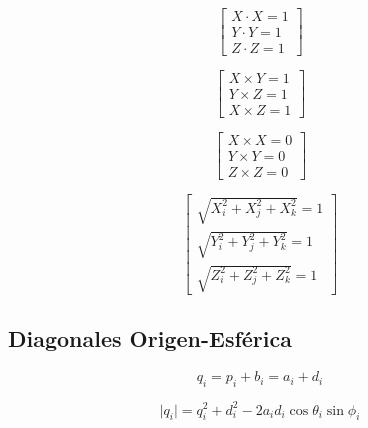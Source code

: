 \documentclass[titlepage, letterpaper, fleqn]{article}
\begin{document}
\begin{equation}
    \label{eq:dot_same_unit_vector}
    \begin{bmatrix}
    X \cdot X = 1 \\
    Y \cdot Y = 1 \\
    Z \cdot Z = 1
    \end{bmatrix}
\end{equation}

\begin{equation}
    \label{eq:cross_unit_vectors}
    \begin{bmatrix}
    X \times Y = 1 \\
    Y \times Z = 1 \\
    X \times Z = 1
    \end{bmatrix}
\end{equation}

\begin{equation}
    \label{eq:cross_same_unit_vector}
    \begin{bmatrix}
    X \times X = 0 \\
    Y \times Y = 0 \\
    Z \times Z = 0
    \end{bmatrix}
\end{equation}

\begin{equation}
    \label{eq:magnitude_unit_vector}
    \begin{bmatrix}
    \sqrt{X_i^2 + X_j^2 + X_k^2} = 1 \\
    \sqrt{Y_i^2 + Y_j^2 + Y_k^2} = 1 \\
    \sqrt{Z_i^2 + Z_j^2 + Z_k^2} = 1
    \end{bmatrix}
\end{equation}


\subsection{Diagonales Origen-Esférica} %
\label{subsec:diagonales_origen_esferica}

\begin{equation}
    \label{eq:q_vectors}
    q_i = p_i + b_i = a_i + d_i
\end{equation}

\begin{equation}
    \label{eq:q_vector_magnitude}
    \lvert q_i \rvert = q_i^2 + d_i^2 - 2a_id_i\cos\theta_i\sin\phi_i
\end{equation}
\end{document}
